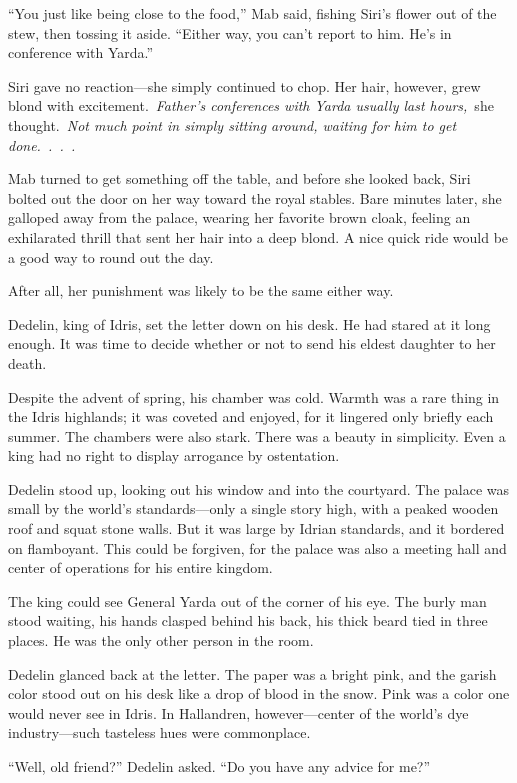 “You just like being close to the food,” Mab said, fishing Siri’s flower out of the stew, then tossing it aside. “Either way, you can’t report to him. He’s in conference with Yarda.”

Siri gave no reaction—she simply continued to chop. Her hair, however, grew blond with excitement.~\textit{Father’s conferences with Yarda usually last hours,}~she thought.~\textit{Not much point in simply sitting around, waiting for him to get done.~.~.~.}

Mab turned to get something off the table, and before she looked back, Siri bolted out the door on her way toward the royal stables. Bare minutes later, she galloped away from the palace, wearing her favorite brown cloak, feeling an exhilarated thrill that sent her hair into a deep blond. A nice quick ride would be a good way to round out the day.

After all, her punishment was likely to be the same either way.

\orn

Dedelin, king of Idris, set the letter down on his desk. He had stared at it long enough. It was time to decide whether or not to send his eldest daughter to her death.

Despite the advent of spring, his chamber was cold. Warmth was a rare thing in the Idris highlands; it was coveted and enjoyed, for it lingered only briefly each summer. The chambers were also stark. There was a beauty in simplicity. Even a king had no right to display arrogance by ostentation.

Dedelin stood up, looking out his window and into the courtyard. The palace was small by the world’s standards—only a single story high, with a peaked wooden roof and squat stone walls. But it was large by Idrian standards, and it bordered on flamboyant. This could be forgiven, for the palace was also a meeting hall and center of operations for his entire kingdom.

The king could see General Yarda out of the corner of his eye. The burly man stood waiting, his hands clasped behind his back, his thick beard tied in three places. He was the only other person in the room.

Dedelin glanced back at the letter. The paper was a bright pink, and the garish color stood out on his desk like a drop of blood in the snow. Pink was a color one would never see in Idris. In Hallandren, however—center of the world’s dye industry—such tasteless hues were commonplace.

“Well, old friend?” Dedelin asked. “Do you have any advice for me?”

